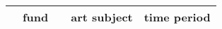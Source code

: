 \begin{table}[th]
\begin{tabular}{|c|l|l|l|l|}
      &  fund &       & art subject & time period\\
      \hline
\end{tabular}%
\end{table}


